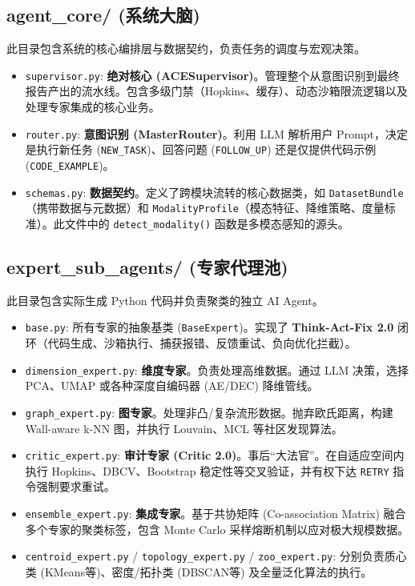 \documentclass[12pt,a4paper]{article}
\begin{document}
\subsection{agent\_core/ (系统大脑)}
此目录包含系统的核心编排层与数据契约，负责任务的调度与宏观决策。
\begin{itemize}[nosep]
    \item \texttt{supervisor.py}: \textbf{绝对核心 (ACESupervisor)}。管理整个从意图识别到最终报告产出的流水线。包含多级门禁（Hopkins、缓存）、动态沙箱限流逻辑以及处理专家集成的核心业务。
    \item \texttt{router.py}: \textbf{意图识别 (MasterRouter)}。利用 LLM 解析用户 Prompt，决定是执行新任务 (\texttt{NEW\_TASK})、回答问题 (\texttt{FOLLOW\_UP}) 还是仅提供代码示例 (\texttt{CODE\_EXAMPLE})。
    \item \texttt{schemas.py}: \textbf{数据契约}。定义了跨模块流转的核心数据类，如 \texttt{DatasetBundle}（携带数据与元数据）和 \texttt{ModalityProfile}（模态特征、降维策略、度量标准）。此文件中的 \texttt{detect\_modality()} 函数是多模态感知的源头。
\end{itemize}

\subsection{expert\_sub\_agents/ (专家代理池)}
此目录包含实际生成 Python 代码并负责聚类的独立 AI Agent。
\begin{itemize}[nosep]
    \item \texttt{base.py}: 所有专家的抽象基类 (\texttt{BaseExpert})。实现了 \textbf{Think-Act-Fix 2.0} 闭环（代码生成、沙箱执行、捕获报错、反馈重试、负向优化拦截）。
    \item \texttt{dimension\_expert.py}: \textbf{维度专家}。负责处理高维数据。通过 LLM 决策，选择 PCA、UMAP 或各种深度自编码器 (AE/DEC) 降维管线。
    \item \texttt{graph\_expert.py}: \textbf{图专家}。处理非凸/复杂流形数据。抛弃欧氏距离，构建 Wall-aware k-NN 图，并执行 Louvain、MCL 等社区发现算法。
    \item \texttt{critic\_expert.py}: \textbf{审计专家 (Critic 2.0)}。事后“大法官”。在自适应空间内执行 Hopkins、DBCV、Bootstrap 稳定性等交叉验证，并有权下达 \texttt{RETRY} 指令强制要求重试。
    \item \texttt{ensemble\_expert.py}: \textbf{集成专家}。基于共协矩阵 (Co-association Matrix) 融合多个专家的聚类标签，包含 Monte Carlo 采样熔断机制以应对极大规模数据。
    \item \texttt{centroid\_expert.py} / \texttt{topology\_expert.py} / \texttt{zoo\_expert.py}: 分别负责质心类 (KMeans等)、密度/拓扑类 (DBSCAN等) 及全量泛化算法的执行。
\end{itemize}
\end{document}
